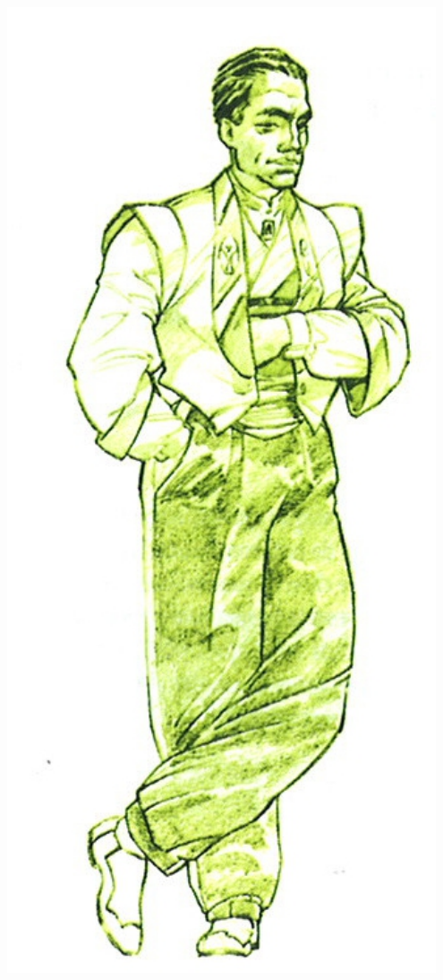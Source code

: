\documentclass[40pt,twoside,a4paper]{article}
\begin{document}
\begin{landscape}
		 ~\\ ~\\ ~\\
		
		\begin{minipage}[ht]{0.10\textwidth}
			\includegraphics[width=0.95\textwidth]{../img/personnagePaulMorgan.jpg} ~\\~\\

\end{minipage}
\end{landscape}
\end{document}
